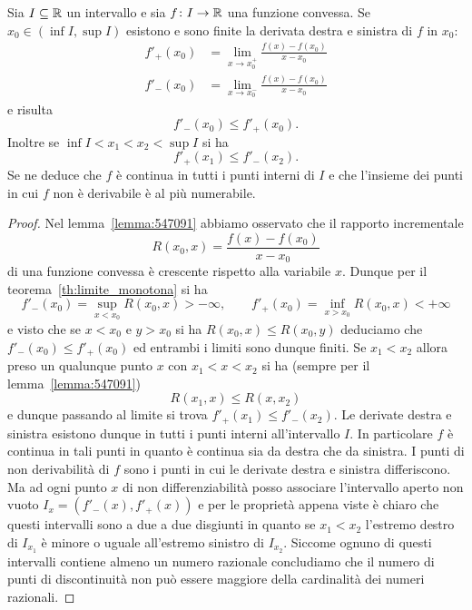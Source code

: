 \begin{theorem}
  Sia $I\subseteq {\mathbb R}$ un intervallo e sia $f\colon I \to {\mathbb R}$ una funzione convessa.
  Se $x_0\in (\inf I, \sup I)$ esistono e sono finite la derivata destra 
  e sinistra di $f$ in $x_0$:
  \begin{align*}
    f'_+(x_0) &= \lim_{x\to x_0^+} \frac{f(x)-f(x_0)}{x-x_0}\\
    f'_-(x_0)  &= \lim_{x\to x_0^-} \frac{f(x)-f(x_0)}{x-x_0}  
  \end{align*}
  e risulta
  \[
    f'_-(x_0) \le f'_+(x_0).
  \]
  Inoltre se $\inf I < x_1 < x_2 < \sup I$ si ha 
  \[
    f'_+(x_1) \le f'_-(x_2).
  \]
  Se ne deduce che $f$ è continua in tutti i punti interni di $I$ 
  e che l'insieme dei punti in cui $f$ non è derivabile 
  è al più numerabile.
  \end{theorem}
  \begin{proof}
    Nel lemma~\ref{lemma:547091} abbiamo osservato che il rapporto incrementale
    \[
      R(x_0,x) = \frac{f(x)-f(x_0)}{x-x_0}
    \] 
    di una funzione convessa è crescente rispetto alla variabile $x$. 
    Dunque per il teorema~\ref{th:limite_monotona} si 
    ha 
    \[
      f'_-(x_0) = \sup_{x<x_0} R(x_0,x)>-\infty, \qquad 
      f'_+(x_0) = \inf_{x>x_0} R(x_0,x)<+\infty
    \]
    e visto che se $x<x_0$ e $y>x_0$ si ha $R(x_0,x)\le R(x_0,y)$ 
    deduciamo che $f'_-(x_0)\le f'_+(x_0)$ ed entrambi i limiti 
    sono dunque finiti. Se $x_1 < x_2$ allora preso un qualunque 
    punto $x$ con $x_1<x<x_2$ si ha (sempre per il lemma~\ref{lemma:547091})
    \[
      R(x_1,x) \le R(x,x_2)
    \]
    e dunque passando al limite si trova $f'_+(x_1) \le f'_-(x_2)$.
    Le derivate destra e sinistra esistono dunque in tutti i punti interni 
    all'intervallo $I$. 
    In particolare $f$ è continua in tali punti in quanto è continua sia da destra 
    che da sinistra.
    I punti di non derivabilità di $f$ sono i punti in cui 
    le derivate destra e sinistra differiscono. 
    Ma ad ogni punto $x$ di non differenziabilità 
    posso associare l'intervallo aperto non vuoto $I_x = (f'_-(x),f'_+(x))$ e per 
    le proprietà appena viste è chiaro che questi intervalli sono a due a due disgiunti
    in quanto se $x_1<x_2$ l'estremo destro di $I_{x_1}$ è minore o uguale all'estremo 
    sinistro di $I_{x_2}$.
    Siccome ognuno di questi intervalli contiene almeno un numero razionale concludiamo che 
    il numero di punti di discontinuità non può essere maggiore della cardinalità 
    dei numeri razionali.
  \end{proof}
  
